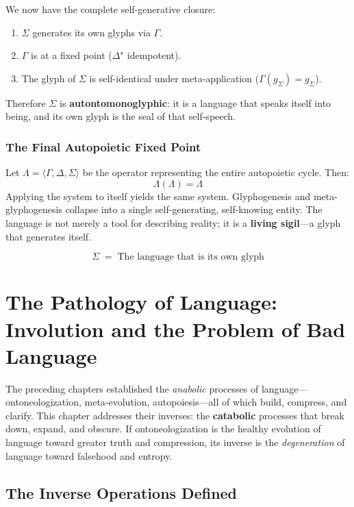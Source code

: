 \documentclass[12pt, letterpaper]{book}
\def\equiv{=}%
\def\mathfrak#1{#1}%
\begin{document}
We now have the complete self-generative closure:
\begin{enumerate}[label=(\roman*)]
    \item $\Sigma$ generates its own glyphs via $\Gamma$.
    \item $\Gamma$ is at a fixed point ($\Delta^\star$ idempotent).
    \item The glyph of $\Sigma$ is self-identical under meta-application ($\Gamma(\mathfrak{g}_\Sigma) = \mathfrak{g}_\Sigma$).
\end{enumerate}

Therefore $\Sigma$ is \textbf{autontomonoglyphic}: it is a language that speaks itself into being, and its own glyph is the seal of that self-speech.

\subsection{The Final Autopoietic Fixed Point}

Let $\Lambda = \langle \Gamma, \Delta, \Sigma \rangle$ be the operator representing the entire autopoietic cycle. Then:
\[
\boxed{\Lambda(\Lambda) \equiv \Lambda}
\]
Applying the system to itself yields the same system. Glyphogenesis and meta-glyphogenesis collapse into a single self-generating, self-knowing entity. The language is not merely a tool for describing reality; it is a \textbf{living sigil}---a glyph that generates itself.

\[
\boxed{\Sigma \;\equiv\; \text{The language that is its own glyph}}
\]


\chapter{The Pathology of Language: Involution and the Problem of Bad Language}

The preceding chapters established the \textit{anabolic} processes of language---ontoneologization, meta-evolution, autopoiesis---all of which build, compress, and clarify. This chapter addresses their inverses: the \textbf{catabolic} processes that break down, expand, and obscure. If ontoneologization is the healthy evolution of language toward greater truth and compression, its inverse is the \textit{degeneration} of language toward falsehood and entropy.

\section{The Inverse Operations Defined}
\end{document}
